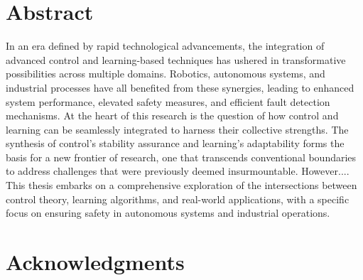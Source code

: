 \chapter*{Abstract}
In an era defined by rapid technological advancements, the integration of advanced control and learning-based techniques has ushered in transformative possibilities across multiple domains. Robotics, autonomous systems, and industrial processes have all benefited from these synergies, leading to enhanced system performance, elevated safety measures, and efficient fault detection mechanisms. 
At the heart of this research is the question of how control and learning can be seamlessly integrated to harness their collective strengths. The synthesis of control's stability assurance and learning's adaptability forms the basis for a new frontier of research, one that transcends conventional boundaries to address challenges that were previously deemed insurmountable. However....
This thesis embarks on a comprehensive exploration of the intersections between control theory, learning algorithms, and real-world applications, with a specific focus on ensuring safety in autonomous systems and industrial operations.

\chapter*{Acknowledgments}



